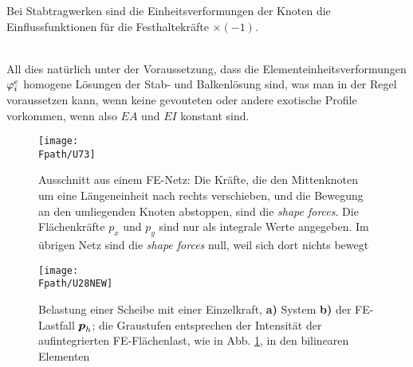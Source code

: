 \hspace*{-12pt}\colorbox{highlightBlue}{\parbox{0.98\textwidth}{Bei Stabtragwerken sind die Einheitsverformungen der Knoten die Einflussfunktionen f\"{u}r die Festhaltekr\"{a}fte $\times (-1)$.}}\\

All dies nat\"{u}rlich unter der Voraussetzung, dass die Elementeinheitsverformungen $\varphi_i^e$ homogene L\"{o}sungen der Stab- und Balkenl\"{o}sung sind, was man in der Regel voraussetzen kann, wenn keine gevouteten oder andere exotische Profile vorkommen, wenn also $EA$ und $EI$ konstant sind.

\begin{figure}[tbp]
\centering
\if {} \sidecaption \fi
\texttt{[image: \\Fpath/U73]}
\caption{Ausschnitt aus einem FE-Netz: Die Kr\"{a}fte, die den Mittenknoten um eine L\"{a}ngeneinheit nach rechts verschieben, und die Bewegung an den umliegenden Knoten abstoppen, sind die {\em shape forces\/}. Die Fl\"{a}chenkr\"{a}fte $p_x$ und $p_y$ sind nur als integrale Werte angegeben. Im \"{u}brigen Netz sind die {\em shape forces\/} null, weil sich dort nichts bewegt} \label{U73}
\end{figure}%

\begin{figure}[tbp]
\centering
\if {} \sidecaption \fi
\texttt{[image: \\Fpath/U28NEW]}
\caption{Belastung einer Scheibe mit einer Einzelkraft, {\bf a)} System {\bf b)} der FE-Lastfall $\mbox{\boldmath $p$}_h$; die Graustufen entsprechen der Intensit\"{a}t der aufintegrierten FE-Fl\"{a}chenlast, wie in Abb. \ref{U73}, in den bilinearen Elementen} \label{U28}
\end{figure}%

